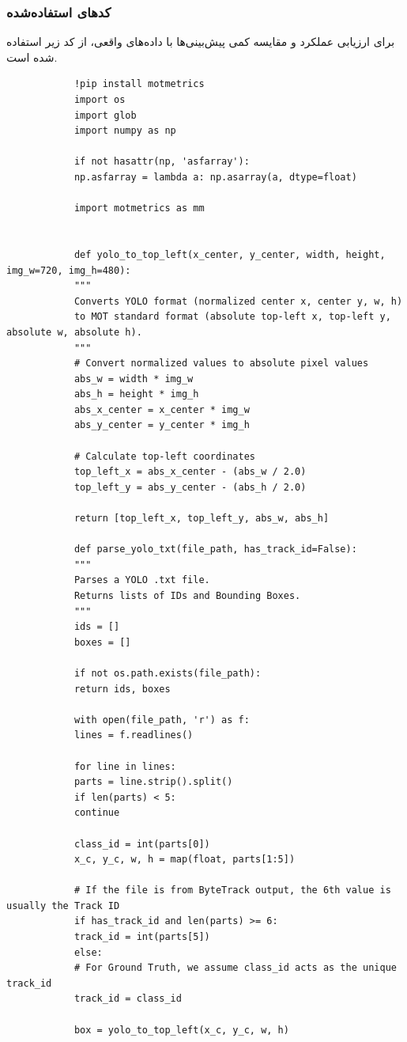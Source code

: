 \documentclass{article}
\begin{document}
\subsubsection{کدهای استفاده‌شده}
برای ارزیابی عملکرد و مقایسه کمی پیش‌بینی‌ها با داده‌های واقعی، از کد زیر استفاده شده است.
\begin{latin}
	\begin{LTR}
		\begin{verbatim}
			!pip install motmetrics
			import os
			import glob
			import numpy as np
			
			if not hasattr(np, 'asfarray'):
			np.asfarray = lambda a: np.asarray(a, dtype=float)
			
			import motmetrics as mm
			
			
			def yolo_to_top_left(x_center, y_center, width, height, img_w=720, img_h=480):
			"""
			Converts YOLO format (normalized center x, center y, w, h)
			to MOT standard format (absolute top-left x, top-left y, absolute w, absolute h).
			"""
			# Convert normalized values to absolute pixel values
			abs_w = width * img_w
			abs_h = height * img_h
			abs_x_center = x_center * img_w
			abs_y_center = y_center * img_h
			
			# Calculate top-left coordinates
			top_left_x = abs_x_center - (abs_w / 2.0)
			top_left_y = abs_y_center - (abs_h / 2.0)
			
			return [top_left_x, top_left_y, abs_w, abs_h]
			
			def parse_yolo_txt(file_path, has_track_id=False):
			"""
			Parses a YOLO .txt file.
			Returns lists of IDs and Bounding Boxes.
			"""
			ids = []
			boxes = []
			
			if not os.path.exists(file_path):
			return ids, boxes
			
			with open(file_path, 'r') as f:
			lines = f.readlines()
			
			for line in lines:
			parts = line.strip().split()
			if len(parts) < 5:
			continue
			
			class_id = int(parts[0])
			x_c, y_c, w, h = map(float, parts[1:5])
			
			# If the file is from ByteTrack output, the 6th value is usually the Track ID
			if has_track_id and len(parts) >= 6:
			track_id = int(parts[5])
			else:
			# For Ground Truth, we assume class_id acts as the unique track_id
			track_id = class_id
			
			box = yolo_to_top_left(x_c, y_c, w, h)
			

\end{verbatim}
\end{LTR}
\end{latin}
\end{document}
